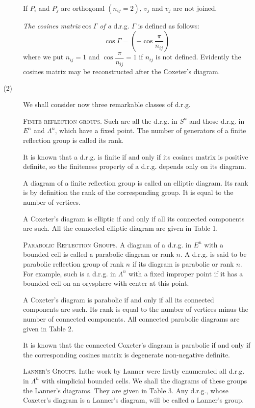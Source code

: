 \begin{description}
If $P_i$ and $P_j$ are orthogonal $(n_{ij} =2)$, $v_j$ and $v_j$  are not joined. 

\textit{The cosines matrix}\pageoriginale $\cos \Gamma$ \textit{of a} d.r.g. $\Gamma$ is defined as follows:
$$
\cos \Gamma = \left(-\cos \frac{\pi}{n_{ij}} \right)
$$
where we put $n_{ij} =1$ and $\cos \dfrac{\pi}{n_{ij}} =1$ if $n_{ij}$ is not defined. Evidently the cosines matrix may be reconstructed after the Coxeter's diagram. 

\item[(2)] We shall consider now three remarkable classes of d.r.g.

\textsc{Finite reflection groups.} Such are all the d.r.g. in $S^n$ and those d.r.g. in $E^n$ and $\Lambda^n$, which have a fixed point. The number of generators of a finite reflection group is called its rank.

It is known \cite{art10-key1} that a d.r.g. is finite if and only if its cosines matrix is positive definite, so the finiteness property of a d.r.g. depends only on its diagram. 

A diagram of a finite reflection group is called an elliptic diagram. Its rank is by definition the rank of the corresponding group. It is equal to the number of vertices.

A Coxeter's diagram is elliptic if and  only if all its connected components are such. All the connected elliptic diagram are given in Table 1.

\medskip
\noindent
\textsc{Parabolic Reflection Groups.} A diagram of a d.r.g. in $E^n$ with a bounded cell is called a parabolic diagram or rank $n$. A d.r.g. is said to be parabolic reflection group of rank $n$ if its diagram is parabolic or rank $n$. For example, such is a d.r.g. in $\Lambda^n$ with a fixed improper point if it has a bounded cell on an orysphere with center at this point.

A Coxeter's diagram is parabolic if and only if all its connected components are such. Its rank is equal to the number of vertices minus the number of connected components. All connected parabolic diagrams are  given in Table 2.

It is known \cite{art10-key1} that the connected Coxeter's diagram is parabolic if and only if the corresponding cosines matrix is degenerate non-negative definite.

\medskip
\noindent
\textsc{Lanner's Groups.} In\pageoriginale the work \cite{art10-key3} by Lanner were firstly enumerated all d.r.g. in $\Lambda^n$ with simplicial bounded cells. We shall the diagrams of these groups the Lanner's diagrams. They are given in Table 3. Any d.r.g., whose Coxeter's diagram is a Lanner's diagram, will be called a Lanner's group. 


\end{description}
